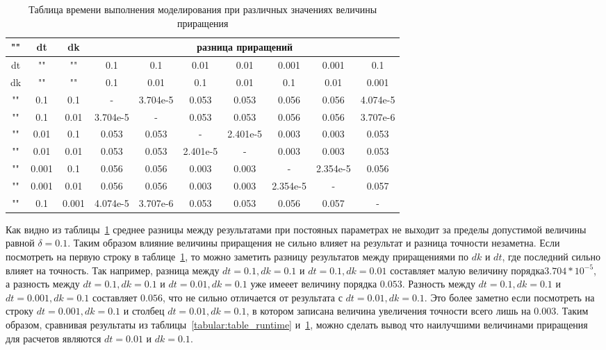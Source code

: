 \begin{table}[h!]
    \caption{Таблица времени выполнения моделирования при различных значениях величины приращения}
    \label{tabular:different_delta}
    \small
    \begin{tabular}{|c|c|c|c|c|c|c|c|c|c|}
        "" & dt & dk & \multicolumn{7}{c}{разница приращений} \\
        \hline
        dt & "" & "" & 0.1 & 0.1 & 0.01 & 0.01 & 0.001 & 0.001 & 0.1 \\
        dk & "" & "" & 0.1 & 0.01 & 0.1 & 0.01 & 0.1 & 0.01 & 0.001 \\
        \hline
        "" & 0.1 & 0.1 & - & 3.704e-5 & 0.053 & 0.053 & 0.056 & 0.056 & 4.074e-5 \\
        "" & 0.1 & 0.01 & 3.704e-5 & - & 0.053 & 0.053 & 0.056 & 0.056 & 3.707e-6 \\
        "" & 0.01 & 0.1 & 0.053 & 0.053 & - & 2.401e-5 & 0.003 & 0.003 & 0.053 \\
        "" & 0.01 & 0.01 & 0.053 & 0.053 & 2.401e-5 & - & 0.003 & 0.003 & 0.053 \\
        "" & 0.001 & 0.1 & 0.056 & 0.056 & 0.003 & 0.003 & - & 2.354e-5 & 0.056 \\
        "" & 0.001 & 0.01 & 0.056 & 0.056 & 0.003 & 0.003 & 2.354e-5 & - & 0.057 \\
        "" & 0.1 & 0.001 & 4.074e-5 & 3.707e-6 & 0.053 & 0.053 & 0.056 & 0.057 & - \\
    \end{tabular}
\end{table}
Как видно из таблицы~\ref{tabular:different_delta} среднее разницы между результатами при постояных
параметрах не выходит за пределы допустимой величины равной $\delta = 0.1$.
Таким образом влияние величины приращения не сильно влияет на результат и разница точности незаметна.
Если посмотреть на первую строку в таблице~\ref{tabular:different_delta}, то можно заметить разницу
результатов между приращениями по $dk$ и $dt$, где последний сильно влияет на точность.
Так например, разница между $dt = 0.1, dk = 0.1$ и $dt = 0.1, dk = 0.01$ составляет малую величину
порядка$3.704*10^{-5}$, а разность между $dt = 0.1, dk = 0.1$ и $dt = 0.01, dk = 0.1$ уже имееет
величину порядка $0.053$.
Разность между $dt = 0.1, dk = 0.1$ и $dt = 0.001, dk = 0.1$ составляет $0.056$, что не сильно
отличается от результата с $dt = 0.01, dk = 0.1$.
Это более заметно если посмотреть на строку $dt = 0.001, dk = 0.1$ и столбец $dt = 0.01, dk = 0.1$,
в котором записана величина увеличения точности всего лишь на $0.003$.
Таким образом, сравнивая результаты из таблицы~\ref{tabular:table_runtime} и~\ref{tabular:different_delta},
можно сделать вывод что наилучшими величинами приращения для расчетов являются $dt = 0.01$ и $dk = 0.1$.


